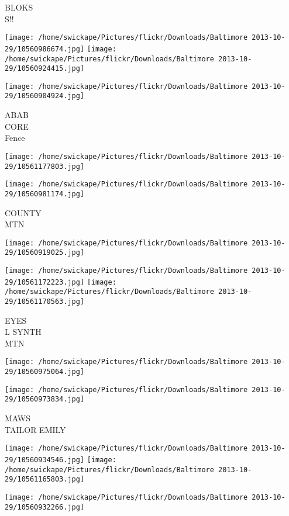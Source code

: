 \documentclass[10pt,letterpaper]{article}
\begin{document}
BLOKS\\
S!!
\pagebreak

\texttt{[image: /home/swickape/Pictures/flickr/Downloads/Baltimore 2013-10-29/10560986674.jpg]}
\texttt{[image: /home/swickape/Pictures/flickr/Downloads/Baltimore 2013-10-29/10560924415.jpg]}

\vspace{0.25in}
\texttt{[image: /home/swickape/Pictures/flickr/Downloads/Baltimore 2013-10-29/10560904924.jpg]}

ABAB\\
CORE\\
Fence
\pagebreak

\texttt{[image: /home/swickape/Pictures/flickr/Downloads/Baltimore 2013-10-29/10561177803.jpg]}

\vspace{0.25in}
\texttt{[image: /home/swickape/Pictures/flickr/Downloads/Baltimore 2013-10-29/10560981174.jpg]}

COUNTY\\
MTN
\pagebreak

\texttt{[image: /home/swickape/Pictures/flickr/Downloads/Baltimore 2013-10-29/10560919025.jpg]}

\vspace{0.25in}
\texttt{[image: /home/swickape/Pictures/flickr/Downloads/Baltimore 2013-10-29/10561172223.jpg]}
\texttt{[image: /home/swickape/Pictures/flickr/Downloads/Baltimore 2013-10-29/10561170563.jpg]}

EYES\\
L SYNTH\\
MTN
\pagebreak

\texttt{[image: /home/swickape/Pictures/flickr/Downloads/Baltimore 2013-10-29/10560975064.jpg]}

\vspace{0.25in}
\texttt{[image: /home/swickape/Pictures/flickr/Downloads/Baltimore 2013-10-29/10560973834.jpg]}

MAWS\\
TAILOR EMILY
\pagebreak

\texttt{[image: /home/swickape/Pictures/flickr/Downloads/Baltimore 2013-10-29/10560934546.jpg]}
\texttt{[image: /home/swickape/Pictures/flickr/Downloads/Baltimore 2013-10-29/10561165803.jpg]}

\texttt{[image: /home/swickape/Pictures/flickr/Downloads/Baltimore 2013-10-29/10560932266.jpg]}
\end{document}
